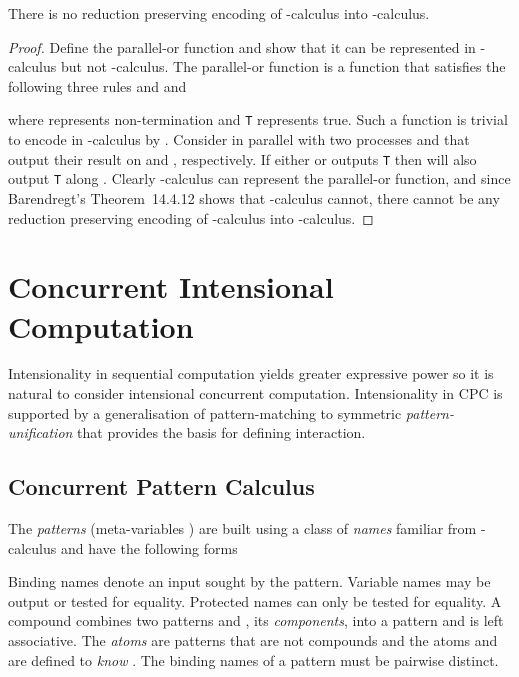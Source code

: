 \documentclass{llncs}
\begin{document}
\begin{theorem}
\label{thm:no-pi2lambda}
There is no reduction preserving encoding of -calculus into -calculus.
\end{theorem}
\begin{proof}
Define the parallel-or function and show that it can be represented in -calculus
but not -calculus.
The parallel-or function is a function  that satisfies the following three rules
 and 
 and

where  represents non-termination and {\texttt T} represents true.
Such a function is trivial to encode in -calculus by
.
Consider  in parallel with two processes  and  that output their result on 
and , respectively.
If either  or  outputs {\texttt T} then  will also output {\texttt T} along .
Clearly -calculus can represent the parallel-or function, and since Barendregt's
Theorem~14.4.12 shows that -calculus cannot, there cannot be any reduction preserving
encoding of -calculus into -calculus.
\end{proof}



\section{Concurrent Intensional Computation}
\label{sec:cic}

Intensionality in sequential computation yields greater expressive power so it is natural to consider intensional concurrent computation.
Intensionality in CPC is supported by a generalisation of pattern-matching to symmetric {\em pattern-unification} that provides the basis for defining interaction.



\subsection{Concurrent Pattern Calculus}
\label{ssec:cpc}


The {\em patterns} (meta-variables )
are built using a class of {\em names} familiar from -calculus and
have the following forms

Binding names  denote an input sought by the pattern.
Variable names   may be output or tested for equality.
Protected names  can only be tested for equality.
A compound combines two patterns  and , its {\em components}, into a pattern  and is left associative.
The {\em atoms} are patterns that are not compounds and the atoms  and  are defined to {\em know} .
The binding names of a pattern must be pairwise distinct.
\end{document}
